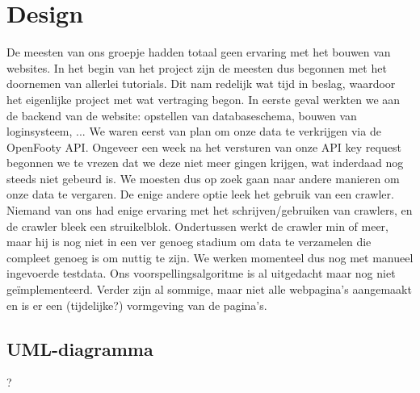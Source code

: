\documentclass[11pt, a4paper]{article}
\begin{document}
\section{Design}
De meesten van ons groepje hadden totaal geen ervaring met het bouwen van websites. In het begin van het project zijn de meesten dus begonnen met het doornemen van allerlei tutorials. Dit nam redelijk wat tijd in beslag, waardoor het eigenlijke project met wat vertraging begon. In eerste geval werkten we aan de backend van de website: opstellen van databaseschema, bouwen van loginsysteem, ... We waren eerst van plan om onze data te verkrijgen via de OpenFooty API. Ongeveer een week na het versturen van onze API key request begonnen we te vrezen dat we deze niet meer gingen krijgen, wat inderdaad nog steeds niet gebeurd is. We moesten dus op zoek gaan naar andere manieren om onze data te vergaren. De enige andere optie leek het gebruik van een crawler. Niemand van ons had enige ervaring met het schrijven/gebruiken van crawlers, en de crawler bleek een struikelblok. Ondertussen werkt de crawler min of meer, maar hij is nog niet in een ver genoeg stadium om data te verzamelen die compleet genoeg is om nuttig te zijn. We werken momenteel dus nog met manueel ingevoerde testdata. Ons voorspellingsalgoritme is al uitgedacht maar nog niet geïmplementeerd. Verder zijn al sommige, maar niet alle webpagina's aangemaakt en is er een (tijdelijke?) vormgeving van de pagina's.

\subsection{UML-diagramma}
?
\end{document}
